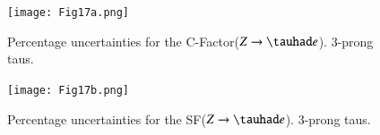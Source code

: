 \begin{figure}[htbp]
	\centering
	\texttt{[image: Fig17a.png]}
	\caption{Percentage uncertainties for the C-Factor($Z\to\tauhad e$). 3-prong taus.}
	\label{Fig20a}
\end{figure}
\begin{figure}[htbp]
	\centering
	\texttt{[image: Fig17b.png]}
	\caption{Percentage uncertainties for the SF($Z\to\tauhad e$). 3-prong taus.}
	\label{Fig20b}
\end{figure}
